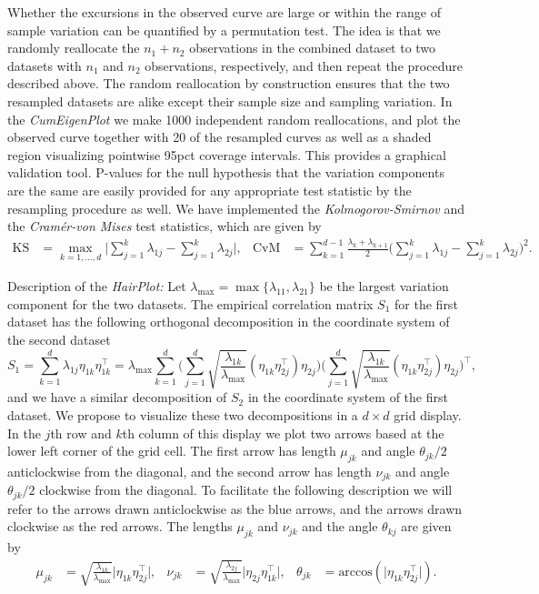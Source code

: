 \documentclass[titlepage,11pt,twoside]{article}
\newcommand{\acos}{\text{arccos}}
\begin{document}
Whether the excursions in the observed curve are large or within the range of sample variation can be quantified by a permutation test. The idea is that we randomly reallocate the $n_1+n_2$ observations in the combined dataset to two datasets with $n_1$ and $n_2$ observations, respectively, and then repeat the procedure described above. The random reallocation by construction ensures that the two resampled datasets are alike except their sample size and sampling variation. In the \emph{CumEigenPlot} we make 1000 independent random reallocations, and plot the observed curve together with 20 of the resampled curves as well as a shaded region visualizing pointwise 95pct coverage intervals. This provides a graphical validation tool. P-values for the null hypothesis that the variation components are the same are easily provided for any appropriate test statistic by the resampling procedure as well. We have implemented the \emph{Kolmogorov-Smirnov} and the \emph{Cram\'er-von Mises} test statistics, which are given by
\begin{align*}
\text{KS} &= \max_{k=1,\dotsc,d} \bigg\lvert \sum_{j=1}^k \lambda_{1j} - \sum_{j=1}^k \lambda_{2j} \bigg\rvert, &
\text{CvM} &= \sum_{k=1}^{d-1} \frac{\lambda_k + \lambda_{k+1}}{2} \bigg( \sum_{j=1}^k \lambda_{1j} - \sum_{j=1}^k \lambda_{2j} \bigg)^2.
\end{align*}

\medskip

Description of the \emph{HairPlot:} Let $\lambda_{\max} = \max\{ \lambda_{11}, \lambda_{21} \}$ be the largest variation component for the two datasets. The empirical correlation matrix $S_1$ for the first dataset has the following orthogonal decomposition in the coordinate system of the second dataset
\begin{equation*}
S_1 = \sum_{k=1}^d \lambda_{1j} \eta_{1k} \eta_{1k}^\top
= \lambda_{\max} \sum_{k=1}^d
\Bigg( \sum_{j=1}^d \sqrt{\frac{\lambda_{1k}}{\lambda_{\max}}} (\eta_{1k} \eta_{2j}^\top) \eta_{2j} \Bigg)
\Bigg( \sum_{j=1}^d \sqrt{\frac{\lambda_{1k}}{\lambda_{\max}}} (\eta_{1k} \eta_{2j}^\top) \eta_{2j} \Bigg)^\top,
\end{equation*}
and we have a similar decomposition of $S_2$ in the coordinate system of the first dataset. We propose to visualize these two decompositions in a $d \times d$ grid display. In the $j$th row and $k$th column of this display we plot two arrows based at the lower left corner of the grid cell. The first arrow has length $\mu_{jk}$ and angle $\theta_{jk}/2$ anticlockwise from the diagonal, and the second arrow has length $\nu_{jk}$ and angle $\theta_{jk}/2$ clockwise from the diagonal. To facilitate the following description we will refer to the arrows drawn anticlockwise as the blue arrows, and the arrows drawn clockwise as the red arrows. The lengths $\mu_{jk}$ and $\nu_{jk}$ and the angle $\theta_{kj}$ are given by
\begin{align*}
\mu_{jk} &= \sqrt{\frac{\lambda_{1k}}{\lambda_{\max}}} \lvert \eta_{1k} \eta_{2j}^\top \rvert, &
\nu_{jk} &= \sqrt{\frac{\lambda_{2j}}{\lambda_{\max}}} \lvert \eta_{2j} \eta_{1k}^\top \rvert, &
\theta_{jk} &= \acos(\lvert \eta_{1k} \eta_{2j}^\top \rvert).
\end{align*}
\end{document}
